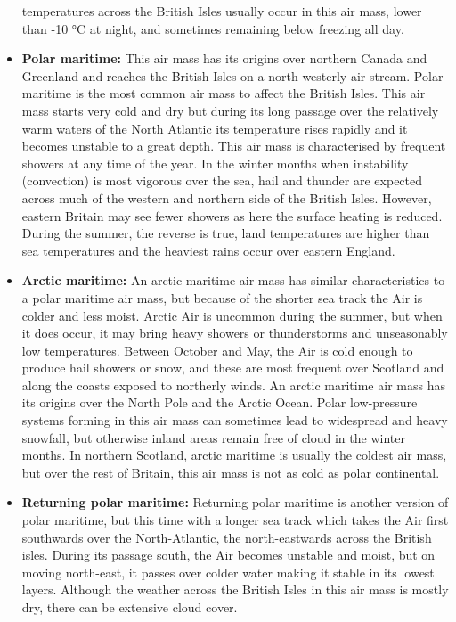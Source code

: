 \documentclass[12pt,oneside]{book}
\begin{document}
\begin{itemize}
  temperatures across the British Isles usually occur in this air mass,
  lower than -10 °C at night, and sometimes remaining below freezing all
  day.
\item
  \textbf{Polar maritime:} This air mass has its origins over northern
  Canada and Greenland and reaches the British Isles on a north-westerly
  air stream. Polar maritime is the most common air mass to affect the
  British Isles. This air mass starts very cold and dry but during its
  long passage over the relatively warm waters of the North Atlantic its
  temperature rises rapidly and it becomes unstable to a great depth.
  This air mass is characterised by frequent showers at any time of the
  year. In the winter months when instability (convection) is most
  vigorous over the sea, hail and thunder are expected across much of
  the western and northern side of the British Isles. However, eastern
  Britain may see fewer showers as here the surface heating is reduced.
  During the summer, the reverse is true, land temperatures are higher
  than sea temperatures and the heaviest rains occur over eastern
  England.
\item
  \textbf{Arctic maritime:} An arctic maritime air mass has similar
  characteristics to a polar maritime air mass, but because of the
  shorter sea track the Air is colder and less moist. Arctic Air is
  uncommon during the summer, but when it does occur, it may bring heavy
  showers or thunderstorms and unseasonably low temperatures. Between
  October and May, the Air is cold enough to produce hail showers or
  snow, and these are most frequent over Scotland and along the coasts
  exposed to northerly winds. An arctic maritime air mass has its
  origins over the North Pole and the Arctic Ocean. Polar low-pressure
  systems forming in this air mass can sometimes lead to widespread and
  heavy snowfall, but otherwise inland areas remain free of cloud in the
  winter months. In northern Scotland, arctic maritime is usually the
  coldest air mass, but over the rest of Britain, this air mass is not
  as cold as polar continental.
\item
  \textbf{Returning polar maritime:} Returning polar maritime is another
  version of polar maritime, but this time with a longer sea track which
  takes the Air first southwards over the North-Atlantic, the
  north-eastwards across the British isles. During its passage south,
  the Air becomes unstable and moist, but on moving north-east, it
  passes over colder water making it stable in its lowest layers.
  Although the weather across the British Isles in this air mass is
  mostly dry, there can be extensive cloud cover.
\end{itemize}
\end{document}
